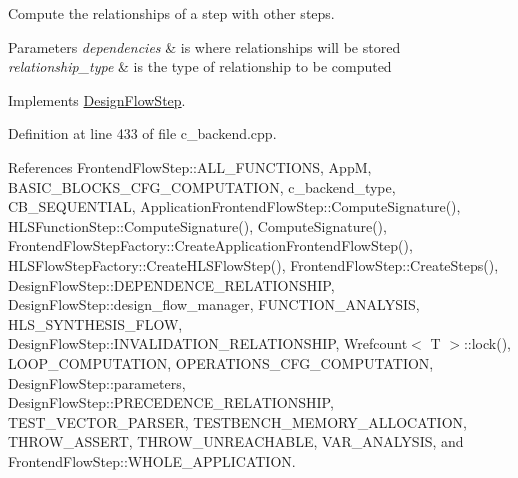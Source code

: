 Compute the relationships of a step with other steps. 


\begin{DoxyParams}{Parameters}
{\em dependencies} & is where relationships will be stored \\
\hline
{\em relationship\+\_\+type} & is the type of relationship to be computed \\
\hline
\end{DoxyParams}


Implements \hyperlink{classDesignFlowStep_a65bf7bcb603189a7ddcf930c3a9fd7fe}{Design\+Flow\+Step}.



Definition at line 433 of file c\+\_\+backend.\+cpp.



References Frontend\+Flow\+Step\+::\+A\+L\+L\+\_\+\+F\+U\+N\+C\+T\+I\+O\+NS, AppM, B\+A\+S\+I\+C\+\_\+\+B\+L\+O\+C\+K\+S\+\_\+\+C\+F\+G\+\_\+\+C\+O\+M\+P\+U\+T\+A\+T\+I\+ON, c\+\_\+backend\+\_\+type, C\+B\+\_\+\+S\+E\+Q\+U\+E\+N\+T\+I\+AL, Application\+Frontend\+Flow\+Step\+::\+Compute\+Signature(), H\+L\+S\+Function\+Step\+::\+Compute\+Signature(), Compute\+Signature(), Frontend\+Flow\+Step\+Factory\+::\+Create\+Application\+Frontend\+Flow\+Step(), H\+L\+S\+Flow\+Step\+Factory\+::\+Create\+H\+L\+S\+Flow\+Step(), Frontend\+Flow\+Step\+::\+Create\+Steps(), Design\+Flow\+Step\+::\+D\+E\+P\+E\+N\+D\+E\+N\+C\+E\+\_\+\+R\+E\+L\+A\+T\+I\+O\+N\+S\+H\+IP, Design\+Flow\+Step\+::design\+\_\+flow\+\_\+manager, F\+U\+N\+C\+T\+I\+O\+N\+\_\+\+A\+N\+A\+L\+Y\+S\+IS, H\+L\+S\+\_\+\+S\+Y\+N\+T\+H\+E\+S\+I\+S\+\_\+\+F\+L\+OW, Design\+Flow\+Step\+::\+I\+N\+V\+A\+L\+I\+D\+A\+T\+I\+O\+N\+\_\+\+R\+E\+L\+A\+T\+I\+O\+N\+S\+H\+IP, Wrefcount$<$ T $>$\+::lock(), L\+O\+O\+P\+\_\+\+C\+O\+M\+P\+U\+T\+A\+T\+I\+ON, O\+P\+E\+R\+A\+T\+I\+O\+N\+S\+\_\+\+C\+F\+G\+\_\+\+C\+O\+M\+P\+U\+T\+A\+T\+I\+ON, Design\+Flow\+Step\+::parameters, Design\+Flow\+Step\+::\+P\+R\+E\+C\+E\+D\+E\+N\+C\+E\+\_\+\+R\+E\+L\+A\+T\+I\+O\+N\+S\+H\+IP, T\+E\+S\+T\+\_\+\+V\+E\+C\+T\+O\+R\+\_\+\+P\+A\+R\+S\+ER, T\+E\+S\+T\+B\+E\+N\+C\+H\+\_\+\+M\+E\+M\+O\+R\+Y\+\_\+\+A\+L\+L\+O\+C\+A\+T\+I\+ON, T\+H\+R\+O\+W\+\_\+\+A\+S\+S\+E\+RT, T\+H\+R\+O\+W\+\_\+\+U\+N\+R\+E\+A\+C\+H\+A\+B\+LE, V\+A\+R\+\_\+\+A\+N\+A\+L\+Y\+S\+IS, and Frontend\+Flow\+Step\+::\+W\+H\+O\+L\+E\+\_\+\+A\+P\+P\+L\+I\+C\+A\+T\+I\+ON.

